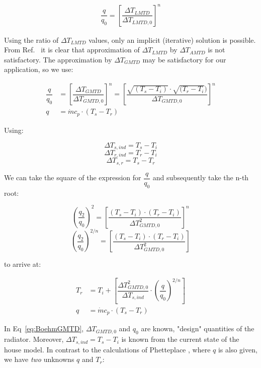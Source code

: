 \begin{equation}
	\begin{aligned}
		\dfrac{q}{q_0} = \left[\dfrac{\Delta T_{LMTD}}{\Delta T_{LMTD,0}}\right]^{n}
	\end{aligned}
	\label{eq:Boehm442}
\end{equation}

Using the ratio of $\Delta T_{LMTD}$ values, only an implicit (iterative) solution is possible. From Ref.~\cite{} it is clear that approximation of $\Delta T_{LMTD}$ by $\Delta T_{AMTD}$ is not satisfactory. The approximation by $\Delta T_{GMTD}$ may be satisfactory for our application, so we use:

\begin{equation}
	\begin{aligned}
		\dfrac{q}{q_0} &= \left[\dfrac{\Delta T_{GMTD}}{\Delta T_{GMTD,0}}\right]^{n} = \left[\dfrac{\sqrt{(T_s - T_{i})} \cdot  \sqrt{(T_r - T_{i}})}{\Delta T_{GMTD,0}}\right]^{n} \\
		q &= \dot{m} c_p \cdot (T_s - T_r)
	\end{aligned}
	\label{eq:BoehmGMTD}
\end{equation}

Using:

$$ \Delta T_{s,ind} = T_s - T_i $$
$$ \Delta T_{r,ind} = T_r - T_i $$
$$ \Delta T_{s,r} = T_s - T_r $$

We can take the square of the expression for $\dfrac{q}{q_0}$  and subsequently take the n-th root: 

$$ \left(\dfrac{q_2}{q_0}\right)^2 = \left[\dfrac{(T_s - T_{i}) \cdot  (T_r - T_{i})}{\Delta T_{GMTD,0}^2}\right]^{n} $$
$$ \left(\dfrac{q_2}{q_0}\right)^{2/n} = \left[\dfrac{(T_s - T_{i}) \cdot  (T_r - T_{i})}{\Delta T_{GMTD,0}^2}\right] $$

to arrive at:

\begin{equation}
	\begin{aligned}
		T_{r} &= T_i + \left[\dfrac{\Delta T_{GMTD,0}^2}{\Delta T_{s,ind}} \cdot \left(\dfrac{q}{q_0}\right)^{2/n}\right] \\
		q &= \dot{m} c_p \cdot (T_s - T_r)
	\end{aligned}
	\label{eq:BoehmGMTD}
\end{equation}


In Eq~\ref{eq:BoehmGMTD}, $\Delta T_{GMTD,0}$ and $q_0$ are known, "design" quantities of the radiator. Moreover, $ \Delta T_{s,ind} = T_s - T_i $ is known from the current state of the house model. In contrast to the calculations of Phetteplace \cite{}, where $q$ is also given, we have \emph{two} unknowns $q$ and $T_r$:

